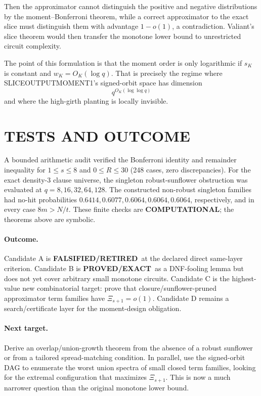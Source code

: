 \documentclass[11pt]{article}
\newcommand{\EXACT}{\textbf{PROVED/EXACT}}
\newcommand{\COMP}{\textbf{COMPUTATIONAL}}
\newcommand{\RETIRED}{\textbf{FALSIFIED/RETIRED}}
\begin{document}
Then the approximator cannot distinguish the positive and negative distributions by the moment--Bonferroni theorem, while a correct approximator to the exact slice must distinguish them with advantage $1-o(1)$, a contradiction. Valiant's slice theorem would then transfer the monotone lower bound to unrestricted circuit complexity.

The point of this formulation is that the moment order is only logarithmic if $s_K$ is constant and $w_K=O_K(\log q)$. That is precisely the regime where SLICEOUTPUTMOMENT1's signed-orbit space has dimension
\[
q^{O_K(\log\log q)}
\]
and where the high-girth planting is locally invisible.

\section{TESTS AND OUTCOME}
A bounded arithmetic audit verified the Bonferroni identity and remainder inequality for $1\le s\le8$ and $0\le R\le30$ (248 cases, zero discrepancies). For the exact density-3 clause universe, the singleton robust-sunflower obstruction was evaluated at $q=8,16,32,64,128$. The constructed non-robust singleton families had no-hit probabilities $0.6414,0.6077,0.6064,0.6064,0.6064$, respectively, and in every case $8m>N/t$. These finite checks are \COMP; the theorems above are symbolic.

\paragraph{Outcome.}
Candidate A is \RETIRED\ at the declared direct same-layer criterion. Candidate B is \EXACT\ as a DNF-fooling lemma but does not yet cover arbitrary small monotone circuits. Candidate C is the highest-value new combinatorial target: prove that closure/sunflower-pruned approximator term families have $\Xi_{s+1}=o(1)$. Candidate D remains a search/certificate layer for the moment-design obligation.

\paragraph{Next target.}
Derive an overlap/union-growth theorem from the absence of a robust sunflower or from a tailored spread-matching condition. In parallel, use the signed-orbit DAG to enumerate the worst union spectra of small closed term families, looking for the extremal configuration that maximizes $\Xi_{s+1}$. This is now a much narrower question than the original monotone lower bound.
\end{document}
